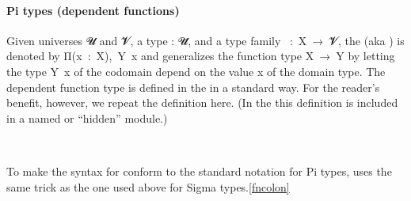 \paragraph*{Pi types (dependent functions)} %
Given universes \ab 𝓤 and \ab 𝓥, a type  \as : \ab 𝓤\af ̇, and a type family ~\as :~\ab X~\as →~\ab 𝓥\af ̇, the  (aka ) is denoted by \ar Π(\ab x~\af :~\ab X),~\ab Y~\ab x and generalizes the function type \ab X~\as →~\ab Y by letting the type \ab Y~\ab x of the codomain depend on the value \ab x of the domain type. The dependent function type is defined in the \typetopology in a standard way.  For the reader's benefit, however, we repeat the definition here.  (In the \ualib this definition is included in a named or ``hidden'' module.)
\ccpad
\begin{code}%
\>[1]\AgdaSpace{}%
\AgdaSymbol{:}\AgdaSpace{}%
\AgdaSymbol{\{}\AgdaSpace{}%
\AgdaSymbol{:}\AgdaSpace{}%
\AgdaSpace{}%
\AgdaSpace{}%
\AgdaSymbol{\}}\AgdaSpace{}%
\AgdaSymbol{(}\AgdaSpace{}%
\AgdaSymbol{:}\AgdaSpace{}%
\AgdaSpace{}%
\AgdaSpace{}%
\AgdaSpace{}%
\AgdaSpace{}%
\AgdaSymbol{)}\AgdaSpace{}%
\AgdaSpace{}%
\AgdaSpace{}%
\AgdaSpace{}%
\AgdaSpace{}%
\<%
\\
%
\>[1]\AgdaSpace{}%
\AgdaSymbol{\{}\AgdaSymbol{\}}\AgdaSpace{}%
\AgdaSpace{}%
\AgdaSymbol{=}\AgdaSpace{}%
\AgdaSymbol{(}\AgdaSpace{}%
\AgdaSymbol{:}\AgdaSpace{}%
\AgdaSymbol{)}\AgdaSpace{}%
\AgdaSpace{}%
\AgdaSpace{}%
\<%
\end{code}
\ccpad
To make the syntax for  conform to the standard notation for Pi types, \escardo uses the same trick as the one used above for Sigma types.\cref{fncolon}
\ccpad
